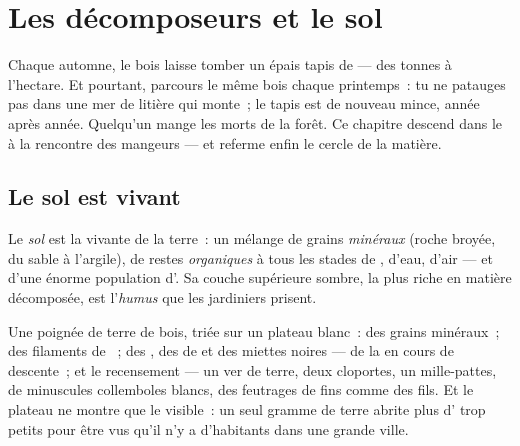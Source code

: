 \chapter{Les décomposeurs et le sol}\label{ch:g6:decomposers-and-soil}

Chaque automne, le bois laisse tomber un épais tapis de  ---
des tonnes à l'hectare. Et pourtant, parcours le même bois chaque
printemps~: tu ne patauges pas dans une mer de litière qui monte~;
le tapis est de nouveau mince, année après année. Quelqu'un mange
les morts de la forêt. Ce chapitre descend dans le  à la
rencontre des mangeurs --- et referme enfin le cercle de la matière.

\section{Le sol est vivant}

\begin{definition}[Le sol]\label{def:g6:decomposers-and-soil:soil}
Le \emph{sol} est la  vivante de la terre~: un
mélange de grains \emph{minéraux} (roche broyée, du sable à
l'argile), de restes \emph{organiques} à tous les stades de
, d'eau, d'air --- et d'une énorme population d'. Sa couche supérieure sombre, la plus riche en matière
décomposée, est l'\emph{humus} que les jardiniers
prisent.
\end{definition}

\begin{example}\label{ex:g6:decomposers-and-soil:handful}
Une poignée de terre de bois, triée sur un plateau blanc~: des
grains minéraux~; des filaments de ~; des , des
 de  et des miettes noires --- de la  en cours de descente~; et le recensement --- un ver de
terre, deux cloportes, un mille-pattes, de minuscules collemboles
blancs, des feutrages de  fins comme des fils. Et le
plateau ne montre que le visible~: un seul gramme de terre abrite
plus d' trop petits pour être vus qu'il n'y a
d'habitants dans une grande ville.
\end{example}


